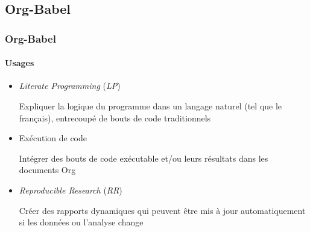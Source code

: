 \documentclass[presentation,t,hideothersubsections]{beamer}
\begin{document}
\subsection{Org-Babel}
\label{sec-5-7}
\begin{frame}
\frametitle{Org-Babel}
\framesubtitle{Usages}
\label{sec-5-7-1}


\begin{itemize}
\item \emph{Literate Programming} (\emph{LP})

  Expliquer la logique du programme dans un langage naturel (tel que le
  français), entrecoupé de bouts de code traditionnels
\item Exécution de code

  Intégrer des bouts de code exécutable et/ou leurs résultats dans les
  documents Org
\item \emph{Reproducible Research} (\emph{RR})

  Créer des rapports dynamiques qui peuvent être mis à jour automatiquement si
  les données ou l'analyse change
\end{itemize}
\end{frame}
\end{document}
